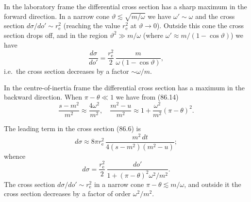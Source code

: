 In the laboratory frame the differential cross section has a sharp maximum in the forward direction. In a narrow cone $\vartheta \lesssim \sqrt{m/\omega}$ we have $\omega' \sim \omega$ and the cross section $d\sigma/do' \sim r_\mathrm{e}^2$ (reaching the value $r_\mathrm{e}^2$ at $\vartheta \to 0$). Outside this cone the cross section drops off, and in the region $\vartheta^2 \gg m/\omega$ (where $\omega' \approx m/(1-\cos\vartheta)$) we have
\[
\frac{d\sigma}{do'} = \frac{r_\mathrm{e}^2}{2}\,\frac{m}{\omega(1-\cos\vartheta)},
\]
i.e.\ the cross section decreases by a factor $\sim \omega/m$.

In the centre-of-inertia frame the differential cross section has a maximum in the backward direction. When $\pi - \theta \ll 1$ we have from (86.14)
\[
\frac{s-m^2}{m^2} \approx \frac{4\omega^2}{m^2}, \quad \frac{m^2-u}{m^2} \approx 1 + \frac{\omega^2}{m^2}(\pi-\theta)^2.
\]


The leading term in the cross section (86.6) is
\[
d\sigma \approx 8\pi r_\mathrm{e}^2\,\frac{m^2\,dt}{4(s-m^2)(m^2 - u)};
\]
whence
\begin{equation}
d\sigma = \frac{r_\mathrm{e}^2}{2}\,\frac{do'}{1 + (\pi-\theta)^2\omega^2/m^2}.
\label{eq:86.20}
\end{equation}
The cross section $d\sigma/do' \sim r_\mathrm{e}^2$ in a narrow cone $\pi - \theta \lesssim m/\omega$, and outside it the cross section decreases by a factor of order $\omega^2/m^2$.
